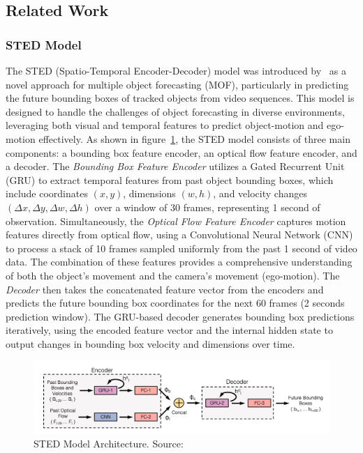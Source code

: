 \documentclass[12pt,oneside]{book} %
\begin{document}
\subsection*{Related Work}
\subsubsection{STED Model}

The STED (Spatio-Temporal Encoder-Decoder) model was introduced
by~\citet{MultipleObjectForecasting} as a novel approach for multiple object
forecasting (MOF), particularly in predicting the future bounding boxes of
tracked objects from video sequences. This model is designed to handle the
challenges of object forecasting in diverse environments, leveraging both
visual and temporal features to predict object-motion and ego-motion
effectively. As shown in figure~\ref{fig:sted}, the STED model consists of
three main components: a bounding box feature encoder, an optical flow feature
encoder, and a decoder. The \textit{Bounding Box Feature Encoder} utilizes a
Gated Recurrent Unit (GRU) to extract temporal features from past object
bounding boxes, which include coordinates $(x, y)$, dimensions $(w, h)$, and
velocity changes $(\Delta x, \Delta y, \Delta w, \Delta h)$ over a window of 30
frames, representing 1 second of observation. Simultaneously, the
\textit{Optical Flow Feature Encoder} captures motion features directly from
optical flow, using a Convolutional Neural Network (CNN) to process a stack of
10 frames sampled uniformly from the past 1 second of video data. The
combination of these features provides a comprehensive understanding of both
the object's movement and the camera's movement (ego-motion). The
\textit{Decoder} then takes the concatenated feature vector from the encoders
and predicts the future bounding box coordinates for the next 60 frames (2
seconds prediction window). The GRU-based decoder generates bounding box
predictions iteratively, using the encoded feature vector and the internal
hidden state to output changes in bounding box velocity and dimensions over
time.

\begin{figure}[H]
    \centering
    \includegraphics[width=1\textwidth]{figures/STED.png}
    \caption{STED Model Architecture. Source:~\citet{MultipleObjectForecasting}}\label{fig:sted}
\end{figure}
\end{document}
